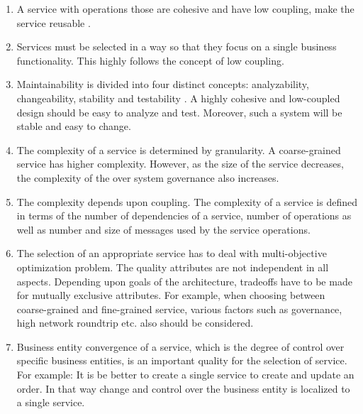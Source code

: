 {{{{{{{{{\begin{enumerate}
\item A service with operations those are cohesive and have low coupling, make the service reusable \cite{Washizakia:2003aa, Feuerlicht:2007aa, Ma:2009aa}.

\item Services must be selected in a way so that they focus on a single business functionality. This highly follows the concept of low coupling. \cite{Perepletchikov:2007aa, Sindhgatta:2015aa}

\item Maintainability is divided into four distinct concepts:  analyzability, changeability, stability and testability \cite{np:2001aa}. A highly cohesive and low-coupled design should be easy to analyze and test. Moreover,  such a system will be stable and easy to change. \cite{Perepletchikov:2007aa}


\item The complexity of a service is determined by granularity. A coarse-grained service has higher complexity. However, as the size of the service decreases, the complexity of the over system governance also increases.
\cite{Saad-Alahmari:2011aa}

\item The complexity depends upon coupling. The complexity of a service is defined in terms of the number of dependencies of a service, number of operations as well as number and size of messages used by the service operations. 
\\
\cite{Saad-Alahmari:2011aa, Sindhgatta:2015aa, Lee:2001aa}

\item The selection of an appropriate service has to deal with multi-objective optimization problem.  The quality attributes are not independent in all aspects. Depending upon goals of the architecture, tradeoffs have to be made for mutually exclusive attributes. For example, when choosing between coarse-grained and fine-grained service, various factors such as governance, high network roundtrip etc. also should be considered. 
\cite{Jamshidi:2008aa}

\item Business entity convergence of a service, which is the degree of control over specific business entities, is an important quality for the selection of service. For example: It is be better to create a single service to create and update an order. In that way change and control over the business entity is localized to a single service.\cite{Ma:2009aa}


\end{enumerate}}}}}}}}}}
